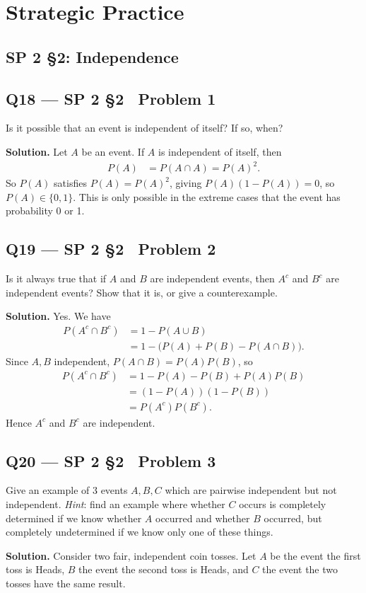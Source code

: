 \documentclass[11pt]{article}
\begin{document}
\section{Strategic Practice}

\subsection{SP 2 \S2: Independence}

\subsection*{Q18 --- SP 2 \S2 \textperiodcentered\ Problem 1}
\begin{qbox}
Is it possible that an event is independent of itself? If so, when?
\end{qbox}
\textbf{Solution.} Let $A$ be an event. If $A$ is independent of itself, then
\begin{align*}
P(A) &= P(A\cap A) = P(A)^2.
\end{align*}
So $P(A)$ satisfies $P(A) = P(A)^2$, giving $P(A)(1-P(A))=0$, so $P(A) \in \{0,1\}$. This is only possible in the extreme cases that the event has probability 0 or 1.

\subsection*{Q19 --- SP 2 \S2 \textperiodcentered\ Problem 2}
\begin{qbox}
Is it always true that if $A$ and $B$ are independent events, then $A^c$ and $B^c$ are independent events? Show that it is, or give a counterexample.
\end{qbox}
\textbf{Solution.} Yes. We have
\begin{align*}
P(A^c\cap B^c) &= 1-P(A\cup B) \\
&= 1-\big(P(A)+P(B)-P(A\cap B)\big).
\end{align*}
Since $A,B$ independent, $P(A\cap B) = P(A)P(B)$, so
\begin{align*}
P(A^c\cap B^c) &= 1-P(A)-P(B)+P(A)P(B) \\
&= (1-P(A))(1-P(B)) \\
&= P(A^c)P(B^c).
\end{align*}
Hence $A^c$ and $B^c$ are independent.

\subsection*{Q20 --- SP 2 \S2 \textperiodcentered\ Problem 3}
\begin{qbox}
Give an example of 3 events $A, B, C$ which are pairwise independent but not independent. \textit{Hint}: find an example where whether $C$ occurs is completely determined if we know whether $A$ occurred and whether $B$ occurred, but completely undetermined if we know only one of these things.
\end{qbox}
\textbf{Solution.} Consider two fair, independent coin tosses. Let $A$ be the event the first toss is Heads, $B$ the event the second toss is Heads, and $C$ the event the two tosses have the same result.
\end{document}
